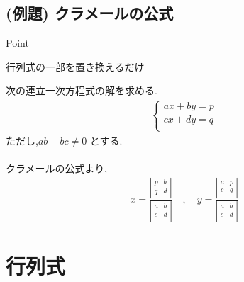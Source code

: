 \documentclass[a4paper]{jsarticle}
\begin{document}
\subsection{(例題) クラメールの公式}
\begin{itembox}[l]{Point}
    \begin{center}
        行列式の一部を置き換えるだけ
    \end{center}
\end{itembox}
次の連立一次方程式の解を求める.
\begin{eqnarray*}
    \begin{cases}
        ax+by=p \\
        cx+dy=q \\
    \end{cases}
\end{eqnarray*}
ただし,$ab-bc\neq 0$ とする.\\
\\
クラメールの公式より,
\begin{eqnarray*}
    x
    =\frac{
        \left| \begin{array}{rr}
            p & b \\
            q & d \\
        \end{array} \right|
    }
    {
        \left| \begin{array}{rr}
            a & b \\
            c & d \\
        \end{array} \right|
    }
    \quad ,\quad
    y
    =\frac{
        \left| \begin{array}{rr}
            a & p \\
            c & q \\
        \end{array} \right|
    }
    {
        \left| \begin{array}{rr}
            a & b \\
            c & d \\
        \end{array} \right|
    }
\end{eqnarray*}
\section{行列式}
\end{document}
